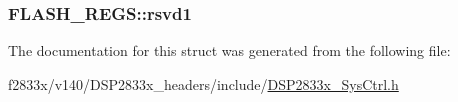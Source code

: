 \subsubsection[{rsvd1}]{ F\+L\+A\+S\+H\+\_\+\+R\+E\+G\+S\+::rsvd1}\label{struct_f_l_a_s_h___r_e_g_s_a908f202dcf45f912317192cf9217cc37}


The documentation for this struct was generated from the following file\+:\begin{DoxyCompactItemize}
\item 
f2833x/v140/\+D\+S\+P2833x\+\_\+headers/include/\hyperlink{_d_s_p2833x___sys_ctrl_8h}{D\+S\+P2833x\+\_\+\+Sys\+Ctrl.\+h}\end{DoxyCompactItemize}
